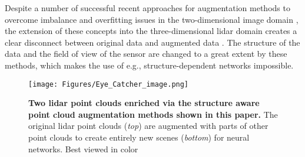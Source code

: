 \documentclass[letterpaper, 10 pt, conference]{ieeeconf}
\begin{document}
Despite a number of successful recent approaches for augmentation methods to overcome imbalance and overfitting issues in the two-dimensional image domain \cite{devries2017improved}\cite{zhang2017mixup}\cite{yun2019cutmix}, the extension of these concepts into the three-dimensional lidar domain creates a clear disconnect between original data and augmented data \cite{chen2020pointmixup}\cite{zhang2021pointcutmix}\cite{nekrasov2021mix3d}. The structure of the data and the field of view of the sensor are changed to a great extent by these methods, which makes the use of e.g., structure-dependent networks\cite{milioto2019rangenet++}\cite{cortinhal2020salsanext} impossible.

\begin{figure}
	\centering
	\texttt{[image: Figures/Eye\_Catcher\_image.png]}
	\caption{\textbf{Two lidar point clouds enriched via the structure aware point cloud augmentation methods shown in this paper.} The original lidar point clouds (\textit{top}) are augmented with parts of other point clouds to create entirely new scenes (\textit{bottom}) for neural networks. Best viewed in color}
	\label{fig:result}
\end{figure}
\end{document}
